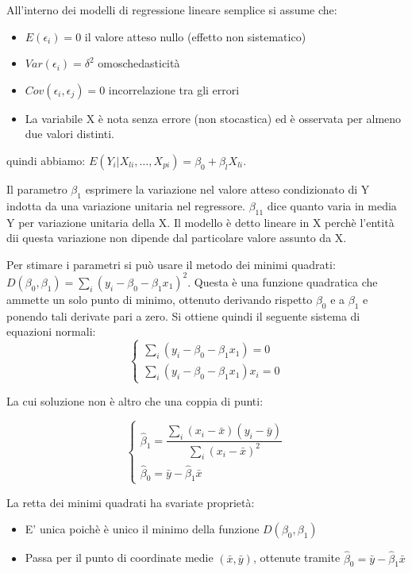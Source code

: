 \documentclass[a4paper]{extarticle}
\begin{document}
All'interno dei modelli di regressione lineare semplice si assume che:
\begin{itemize}
\item $E(\epsilon_i) = 0$ il valore atteso nullo (effetto non sistematico)
\item $Var(\epsilon_i) = \delta^2$ omoschedasticità
\item $Cov(\epsilon_i,\epsilon_j)=0$ incorrelazione tra gli errori 
\item La variabile X è nota senza errore (non stocastica) ed è osservata per almeno due valori distinti.
\end{itemize}

quindi abbiamo: $E(Y_i | X_{li},\dots,X_{pi}) = \beta_0 + \beta_l X_{li}$.

Il parametro $\beta_1$ esprimere la variazione nel valore atteso condizionato di Y indotta da una variazione unitaria nel regressore. $\beta_11$ dice quanto varia in media Y per variazione unitaria della X. Il modello è detto lineare in X perchè l'entità dii questa variazione non dipende dal particolare valore assunto da X.

Per stimare i parametri si può usare il metodo dei minimi quadrati: $D(\beta_0,\beta_1) = \sum\limits_i (y_i - \beta_0 - \beta_1x_1)^2$. Questa è una funzione quadratica che ammette  un solo punto di minimo, ottenuto derivando rispetto $\beta_0$ e a $\beta_1$ e ponendo tali derivate pari a zero. Si ottiene quindi il seguente sistema di equazioni normali:
\begin{equation*}
\begin{cases}
		\sum\limits_i(y_i-\beta_0 - \beta_1x_1) = 0\\
		\sum\limits_i(y_i-\beta_0 - \beta_1x_1)x_i = 0
	\end{cases}
\end{equation*}

La cui soluzione non è altro che una coppia di punti:

\begin{equation*}
\begin{cases}
		\hat \beta_1 = \dfrac{\sum\limits_i(x_i-\bar x)(y_i - \bar y)}{\sum\limits_i(x_i-\bar x)^2}\\
		\hat \beta_0 = \bar y - \hat \beta_1 \bar x
	\end{cases}
\end{equation*}

La retta dei minimi quadrati ha svariate proprietà:
\begin{itemize}
\item E' unica poichè è unico il minimo della funzione $D(\beta_0,\beta_1)$
\item Passa per il punto di coordinate medie $(\bar x, \bar y)$, ottenute tramite $\hat \beta_0 = \bar y - \hat \beta_1 \bar x$ 
\end{itemize} 
\end{document}

